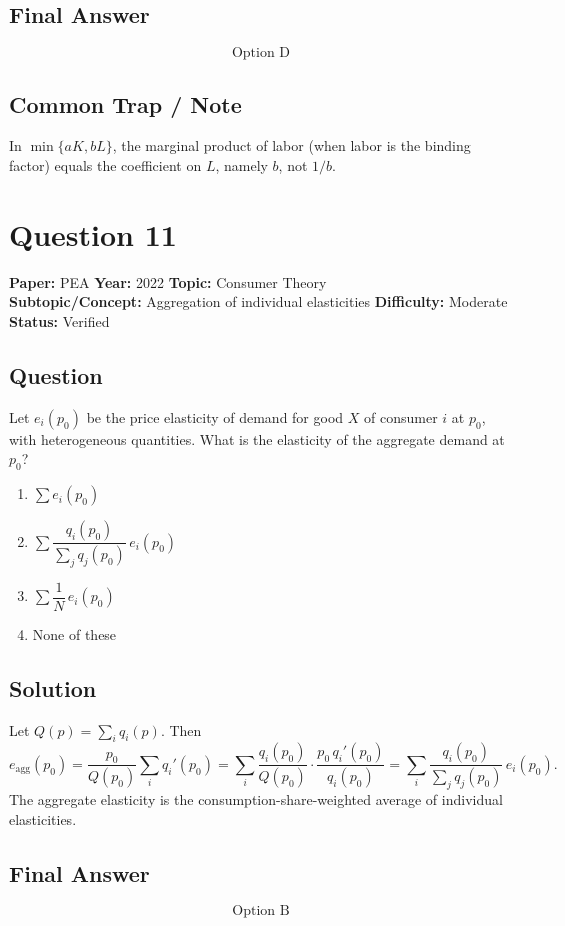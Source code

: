\documentclass[11pt]{article}
\begin{document}
\subsection*{Final Answer}
\[
\boxed{\text{Option D}}
\]

\subsection*{Common Trap / Note}
In $\min\{aK, bL\}$, the marginal product of labor (when labor is the binding factor) equals
the coefficient on $L$, namely $b$, not $1/b$.

\section*{Question 11}
\textbf{Paper:} PEA \quad \textbf{Year:} 2022 \quad \textbf{Topic:} Consumer Theory \\
\textbf{Subtopic/Concept:} Aggregation of individual elasticities \quad \textbf{Difficulty:} Moderate \\
\textbf{Status:} Verified

\subsection*{Question}
Let $e_i(p_0)$ be the price elasticity of demand for good $X$ of consumer $i$ at $p_0$, with
heterogeneous quantities. What is the elasticity of the aggregate demand at $p_0$?
\begin{enumerate}[label=(\Alph*)]
\item $\sum e_i(p_0)$
\item $\sum \dfrac{q_i(p_0)}{\sum_j q_j(p_0)}\, e_i(p_0)$
\item $\sum \dfrac{1}{N}\, e_i(p_0)$
\item None of these
\end{enumerate}

\subsection*{Solution}
Let $Q(p) = \sum_i q_i(p)$. Then
\[
e_{\text{agg}}(p_0) = \frac{p_0}{Q(p_0)} \sum_i q_i'(p_0)
= \sum_i \frac{q_i(p_0)}{Q(p_0)} \cdot \frac{p_0\, q_i'(p_0)}{q_i(p_0)}
= \sum_i \frac{q_i(p_0)}{\sum_j q_j(p_0)}\, e_i(p_0).
\]
The aggregate elasticity is the consumption-share-weighted average of individual elasticities.

\subsection*{Final Answer}
\[
\boxed{\text{Option B}}
\]
\end{document}
